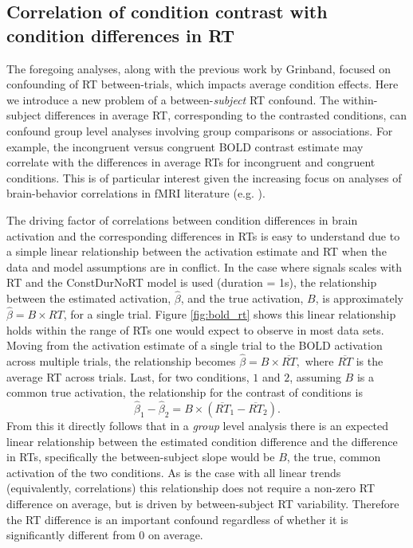 \documentclass[titlepage,12pt] {article}
\begin{document}
\subsection*{Correlation of condition contrast with condition differences in RT}

The foregoing analyses, along with the previous work by Grinband, focused on confounding of RT between-trials, which impacts average condition effects.  Here we introduce a new problem of a between-\emph{subject} RT confound.  The within-subject differences in average RT, corresponding to the contrasted conditions,  can confound group level analyses involving group comparisons or associations.  For example, the incongruent versus congruent BOLD contrast estimate may correlate with the differences in average RTs for incongruent and congruent conditions.  This is of particular interest given the increasing focus on analyses of brain-behavior correlations in fMRI literature (e.g. \citet{duboisBuildingScienceIndividual2016}).

The driving factor of correlations between condition differences in brain activation and the corresponding differences in RTs is easy to understand due to a simple linear relationship between the activation estimate and RT when the data and model assumptions are in conflict. In the case where signals scales with RT and the ConstDurNoRT model is used (duration = 1s), the relationship between the estimated activation, $\hat\beta$, and the true activation, $B$, is approximately $\hat\beta = B \times RT$, for a single trial.  Figure \ref{fig:bold_rt} shows this linear relationship holds within the range of RTs one would expect to observe in most data sets.  Moving from the activation estimate of a single trial to the BOLD activation across multiple trials, the relationship becomes $\hat\beta = B\times \overline{RT}, $ where $\overline{RT}$ is the average RT across trials.  Last, for two conditions, $1$ and $2$, assuming $B$ is a common true activation, the relationship for the contrast of conditions is $$\hat\beta_1 -\hat\beta_2 = B\times\left(\overline{RT}_1 - \overline{RT}_2\right).$$
From this it directly follows that in a \emph{group} level analysis there is an expected linear relationship between the estimated condition difference and the difference in RTs, specifically the between-subject slope would be $B$, the true, common activation of the two conditions.  As is the case with all linear trends (equivalently, correlations) this relationship does not require a non-zero RT difference on average, but is driven by between-subject RT variability. Therefore the RT difference is an important confound regardless of whether it is significantly different from 0 on average.  
\end{document}
